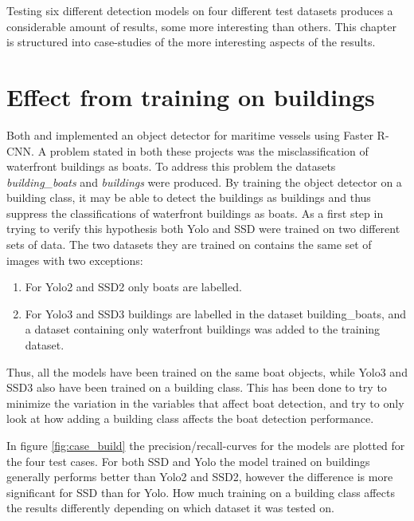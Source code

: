 Testing six different detection models on four different test datasets produces a considerable amount of results, some more interesting than others. This chapter is structured into case-studies of the more interesting aspects of the results.

\newpage

\section{Effect from training on buildings}

Both \citep{Tangstad2017} and \citep{Kamsvag2018} implemented an object detector for maritime vessels using Faster R-CNN. A problem stated in both these projects was the misclassification of waterfront buildings as boats. To address this problem the datasets \textit{building\_boats} and \textit{buildings} were produced. By training the object detector on a building class, it may be able to detect the buildings as buildings and thus suppress the classifications of waterfront buildings as boats. As a first step in trying to verify this hypothesis both Yolo and SSD were trained on two different sets of data. The two datasets they are trained on contains the same set of images with two exceptions:

\vspace{1mm}

\begin{enumerate}
    \item For Yolo2 and SSD2 only boats are labelled.
    \item For Yolo3 and SSD3 buildings are labelled in the dataset building\_boats, and a dataset containing only waterfront buildings was added to the training dataset.
\end{enumerate}

\vspace{1mm}

Thus, all the models have been trained on the same boat objects, while Yolo3 and SSD3 also have been trained on a building class. This has been done to try to minimize the variation in the variables that affect boat detection, and try to only look at how adding a building class affects the boat detection performance.

\vspace{3mm}

In figure \ref{fig:case_build} the precision/recall-curves for the models are plotted for the four test cases. For both SSD and Yolo the model trained on buildings generally performs better than Yolo2 and SSD2, however the difference is more significant for SSD than for Yolo. How much training on a building class affects the results differently depending on which dataset it was tested on. 

